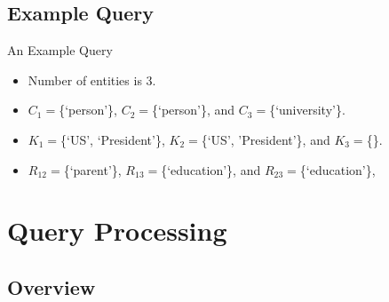 \documentclass[pdf,11pt]{beamer}
\begin{document}
\subsection{Example Query}
\begin{frame}{An Example Query}

\vspace{11pt}


\vspace{11pt}


\begin{itemize}
\item<4-> Number of entities is 3.
\item<5-> $C_1=$\{`person'\}, $C_2=$\{`person'\}, and $C_3=$\{`university'\}.
\item<6-> $K_1=$\{`US', `President'\}, $K_2=$\{`US', 'President'\}, and $K_3=$\{\}.
\item<7-> $R_{12}=$\{`parent'\}, $R_{13}=$\{`education'\}, and $R_{23}=$\{`education'\},
\end{itemize}

\end{frame}

\section{Query Processing}

\begin{frame}
\end{frame}

\subsection{Overview}
\end{document}
